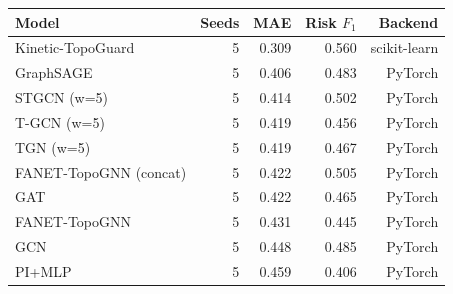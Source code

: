 \begin{tabular}{lrrrr}
\toprule
Model & Seeds & MAE & Risk $F_1$ & Backend \\
\midrule
Kinetic-TopoGuard & 5 & 0.309 & 0.560 & scikit-learn \\
GraphSAGE & 5 & 0.406 & 0.483 & PyTorch \\
STGCN (w=5) & 5 & 0.414 & 0.502 & PyTorch \\
T-GCN (w=5) & 5 & 0.419 & 0.456 & PyTorch \\
TGN (w=5) & 5 & 0.419 & 0.467 & PyTorch \\
FANET-TopoGNN (concat) & 5 & 0.422 & 0.505 & PyTorch \\
GAT & 5 & 0.422 & 0.465 & PyTorch \\
FANET-TopoGNN & 5 & 0.431 & 0.445 & PyTorch \\
GCN & 5 & 0.448 & 0.485 & PyTorch \\
PI+MLP & 5 & 0.459 & 0.406 & PyTorch \\
\bottomrule
\end{tabular}
